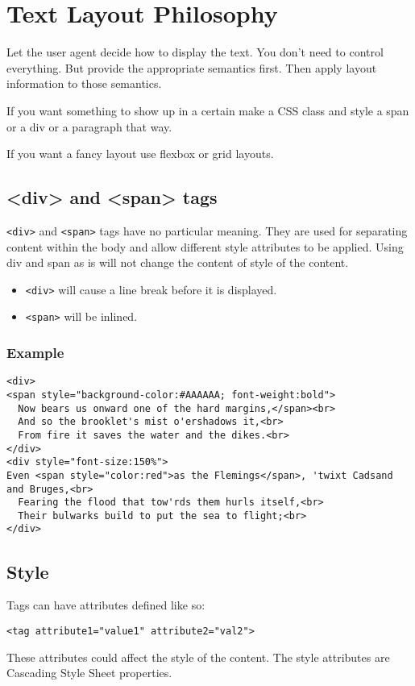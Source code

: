 \documentclass[../CMPUT-404-Notes.tex]{subfiles}
\begin{document}
\section{Text Layout Philosophy}
Let the user agent decide how to display the text. You don't need to control everything. But provide the appropriate semantics first. Then apply layout information to those semantics.

If you want something to show up in a certain make a CSS class and style a span or a div or a paragraph that way.

If you want a fancy layout use flexbox or grid layouts.

\subsection{<div> and <span> tags}
\texttt{<div>} and \texttt{<span>} tags have no particular meaning. They are used for separating content within the body and allow different style attributes to be applied. Using div and span as is will not change the content of style of the content. 

\begin{itemize}
  \item \texttt{<div>} will cause a line break before it is displayed.
  \item \texttt{<span>} will be inlined.
\end{itemize}

\subsubsection{Example} 
\begin{verbatim}
<div>
<span style="background-color:#AAAAAA; font-weight:bold">
  Now bears us onward one of the hard margins,</span><br>
  And so the brooklet's mist o'ershadows it,<br>
  From fire it saves the water and the dikes.<br>
</div>
<div style="font-size:150%">
Even <span style="color:red">as the Flemings</span>, 'twixt Cadsand and Bruges,<br>
  Fearing the flood that tow'rds them hurls itself,<br>
  Their bulwarks build to put the sea to flight;<br>
</div>
\end{verbatim}

\subsection{Style}
Tags can have attributes defined like so: 
\begin{verbatim}
<tag attribute1="value1" attribute2="val2">
\end{verbatim}
These attributes could affect the style of the content. The style attributes are Cascading Style Sheet properties.
\end{document}
